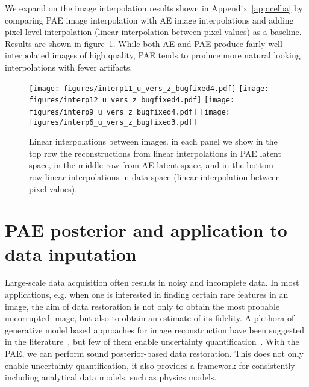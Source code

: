 \documentclass[10pt]{article} \usepackage[accepted]{tmlr}
\newcommand{\rev}[1]{{\color{black}#1}}
\begin{document}
\rev{We expand on the image interpolation results shown in Appendix~\ref{app:celba} by comparing PAE image interpolation with AE image interpolations and adding pixel-level interpolation (linear interpolation between pixel values) as a baseline. Results are shown in figure~\ref{fig:interp_study}. While both AE and PAE produce fairly well interpolated images of high quality, PAE tends to produce more natural looking interpolations with fewer artifacts. 
\begin{figure}
\begin{center}
\texttt{[image: figures/interp11\_u\_vers\_z\_bugfixed4.pdf]}
\texttt{[image: figures/interp12\_u\_vers\_z\_bugfixed4.pdf]}
\texttt{[image: figures/interp9\_u\_vers\_z\_bugfixed4.pdf]}
\texttt{[image: figures/interp6\_u\_vers\_z\_bugfixed3.pdf]}

\caption{Linear interpolations between images. in each panel we show in the top row the reconstructions from linear interpolations in PAE latent space, in the middle row from AE latent space, and in the bottom row linear interpolations in data space (linear interpolation between pixel values).}
\label{fig:interp_study}
\end{center}
\end{figure}}

\section{PAE posterior and application to data inputation}
\label{app:recon}
Large-scale data acquisition often results in noisy and incomplete data. In most applications, e.g. when one is interested in finding certain rare features in an image, the aim of data restoration is not only to obtain the most probable uncorrupted image, but also to obtain an estimate of its fidelity. 
A plethora of generative model based approaches for image reconstruction have been suggested in the literature~\citep{RezendeMW14, Mattei2018, DongLHT15, JinMcCann2016, RIMPutzky, DeepImagePrior, AmbientGAN, MIWAE}, but few of them enable uncertainty quantification~\citep{DeepUQ}. With the PAE, we can perform sound posterior-based data restoration. This does not only enable uncertainty quantification, it also provides a framework for consistently including analytical data models, such as physics models.
\end{document}
